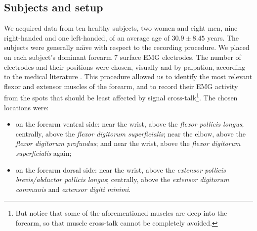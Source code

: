
\subsection{Subjects and setup}

We acquired data from ten healthy subjects, two women and eight men,
nine right-handed and one left-handed, of an average age of $30.9 \pm
8.45$ years. The subjects were generally na\"\i ve with respect to the
recording procedure. We placed on each subject's dominant forearm $7$
surface EMG electrodes. The number of electrodes and their positions
were chosen, visually and by palpation, according to the medical
literature \cite{Kendall}. This procedure allowed us
to identify the most relevant flexor and extensor muscles of the
forearm, and to record their EMG activity from the spots that should
be least affected by signal cross-talk\footnote{But notice that some of the
aforementioned muscles are deep into the forearm, so that muscle
cross-talk cannot be completely avoided.}. The chosen locations were:

\begin{itemize}

  \item on the forearm ventral side: near the wrist, above the
     \emph{flexor pollicis longus}; centrally, above the \emph{flexor
     digitorum superficialis}; near the elbow, above the \emph{flexor
     digitorum profundus}; and near the wrist, above the \emph{flexor
     digitorum superficialis} again;

  \item on the forearm dorsal side: near the wrist, above the
     \emph{extensor pollicis brevis/abductor pollicis longus};
     centrally, above the \emph{extensor digitorum communis} and
     \emph{extensor digiti minimi}.

\end{itemize}


